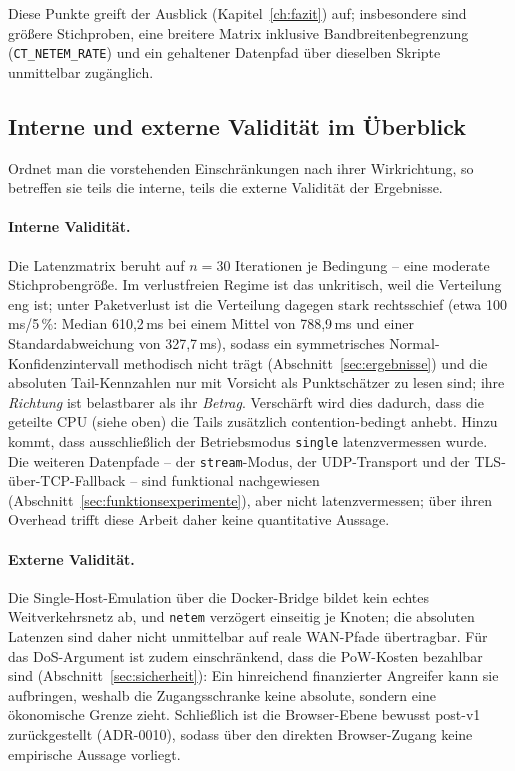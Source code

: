 Diese Punkte greift der Ausblick (Kapitel~\ref{ch:fazit}) auf; insbesondere
sind größere Stichproben, eine breitere Matrix inklusive Bandbreitenbegrenzung
(\texttt{CT\_NETEM\_RATE}) und ein gehaltener Datenpfad über dieselben Skripte
unmittelbar zugänglich.

\subsection{Interne und externe Validität im Überblick}
\label{sec:limitierungen-validitaet}

Ordnet man die vorstehenden Einschränkungen nach ihrer Wirkrichtung, so betreffen
sie teils die interne, teils die externe Validität der Ergebnisse.

\paragraph{Interne Validität.} Die Latenzmatrix beruht auf $n=30$ Iterationen je
Bedingung -- eine moderate Stichprobengröße. Im verlustfreien Regime ist das
unkritisch, weil die Verteilung eng ist; unter Paketverlust ist die Verteilung
dagegen stark rechtsschief (etwa 100\,ms/5\,\%: Median 610{,}2\,ms bei einem
Mittel von 788{,}9\,ms und einer Standardabweichung von 327{,}7\,ms), sodass ein
symmetrisches Normal-Konfidenzintervall methodisch nicht trägt (Abschnitt~\ref{sec:ergebnisse})
und die absoluten Tail-Kennzahlen nur mit Vorsicht als Punktschätzer zu lesen
sind; ihre \emph{Richtung} ist belastbarer als ihr \emph{Betrag}. Verschärft wird
dies dadurch, dass die geteilte CPU (siehe oben) die Tails zusätzlich
contention-bedingt anhebt. Hinzu kommt, dass ausschließlich der
Betriebsmodus \texttt{single} latenzvermessen wurde. Die weiteren Datenpfade --
der \texttt{stream}-Modus, der UDP-Transport und der TLS-über-TCP-Fallback --
sind funktional nachgewiesen (Abschnitt~\ref{sec:funktionsexperimente}), aber
nicht latenzvermessen; über ihren Overhead trifft diese Arbeit daher keine
quantitative Aussage.

\paragraph{Externe Validität.} Die Single-Host-Emulation über die Docker-Bridge
bildet kein echtes Weitverkehrsnetz ab, und \texttt{netem} verzögert einseitig
je Knoten; die absoluten Latenzen sind daher nicht unmittelbar auf reale WAN-Pfade
übertragbar. Für das DoS-Argument ist zudem einschränkend, dass die PoW-Kosten
bezahlbar sind (Abschnitt~\ref{sec:sicherheit}): Ein hinreichend finanzierter
Angreifer kann sie aufbringen, weshalb die Zugangsschranke keine absolute,
sondern eine ökonomische Grenze zieht. Schließlich ist die Browser-Ebene bewusst
post-v1 zurückgestellt (ADR-0010), sodass über den direkten Browser-Zugang keine
empirische Aussage vorliegt.

